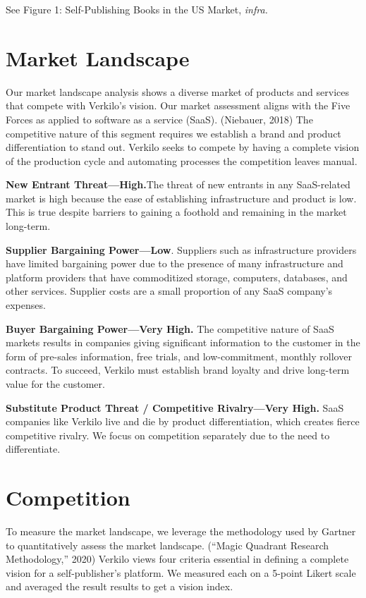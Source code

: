 \documentclass[10pt,openany]{book}
\begin{document}
See Figure 1: Self-Publishing Books in the US Market, \emph{infra.}

\hypertarget{market-landscape}{%
\section{Market Landscape}\label{market-landscape}}

Our market landscape analysis shows a diverse market of products and
services that compete with Verkilo's vision. Our market assessment
aligns with the Five Forces as applied to software as a service (SaaS).
(Niebauer, 2018) The competitive nature of this segment requires we
establish a brand and product differentiation to stand out. Verkilo
seeks to compete by having a complete vision of the production cycle and
automating processes the competition leaves manual.

\textbf{New Entrant Threat---High.}The threat of new entrants in any
SaaS-related market is high because the ease of establishing
infrastructure and product is low. This is true despite barriers to
gaining a foothold and remaining in the market long-term.

\textbf{Supplier Bargaining Power---Low}. Suppliers such as
infrastructure providers have limited bargaining power due to the
presence of many infrastructure and platform providers that have
commoditized storage, computers, databases, and other services. Supplier
costs are a small proportion of any SaaS company's expenses.

\textbf{Buyer Bargaining Power---Very High.} The competitive nature of
SaaS markets results in companies giving significant information to the
customer in the form of pre-sales information, free trials, and
low-commitment, monthly rollover contracts. To succeed, Verkilo must
establish brand loyalty and drive long-term value for the customer.

\textbf{Substitute Product Threat / Competitive Rivalry---Very High.}
SaaS companies like Verkilo live and die by product differentiation,
which creates fierce competitive rivalry. We focus on competition
separately due to the need to differentiate.

\hypertarget{competition}{%
\section{Competition}\label{competition}}

To measure the market landscape, we leverage the methodology used by
Gartner to quantitatively assess the market landscape. (``Magic Quadrant
Research Methodology,'' 2020) Verkilo views four criteria essential in
defining a complete vision for a self-publisher's platform. We measured
each on a 5-point Likert scale and averaged the result results to get a
vision index.
\end{document}
